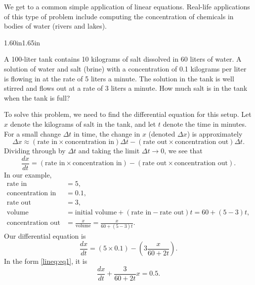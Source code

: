 \begin{example}
We get to a common
simple application of linear equations.
Real-life applications of this type of problem include
computing the concentration of
chemicals in bodies of water (rivers and lakes).

\begin{mywrapfigsimp}{1.60in}{1.65in}
\noindent
{}
\end{mywrapfigsimp}
A 100-liter tank contains 10 kilograms of salt dissolved in 60 liters of
water.  A solution of water and salt (brine) with a concentration of 0.1
kilograms per
liter is flowing in at the rate of 5 liters a minute.  The solution
in the tank is well stirred and flows out at a rate of 3 liters a minute.
How much salt is in the tank when the tank is full?

To solve this problem, we need to find the differential equation
for this setup.
Let $x$ denote the kilograms of salt in the tank, and
let $t$ denote the time in minutes.  For a small change $\Delta t$ in
time, the change in $x$ (denoted $\Delta x$) is approximately
\begin{equation*}
\Delta x \approx
(\text{rate in} \times \text{concentration in}) \Delta t -
(\text{rate out} \times \text{concentration out}) \Delta t .
\end{equation*}
Dividing through by $\Delta t$ and
taking the limit $\Delta t \to 0$, we see that
\begin{equation*}
\frac{dx}{dt} =
(\text{rate in} \times \text{concentration in}) -
(\text{rate out} \times \text{concentration out}) .
\end{equation*}
In our example,
\begin{equation*}
\begin{aligned}
\text{rate in} &= 5 , \\
\text{concentration in} &= 0.1 , \\
\text{rate out} &= 3 , \\
\text{volume} &= \text{initial volume} + (\text{rate in} - \text{rate out})t
= 60+(5-3)t, \\
\text{concentration out} &= \frac{x}{\text{volume}} = \frac{x}{60+(5-3)t} .
\end{aligned}
\end{equation*}
Our differential equation is
\begin{equation*}
\frac{dx}{dt} =
(5 \times 0.1) -
\left(3 \frac{x}{60+2t}\right) .
\end{equation*}
In the form \eqref{lineq:eq1}, it is
\begin{equation*}
\frac{dx}{dt} +
\frac{3}{60+2t} x
=
0.5 .
\end{equation*}


\end{example}
